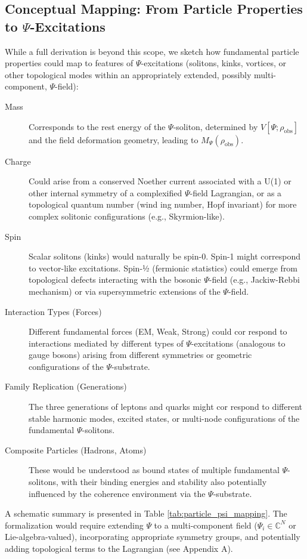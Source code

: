 \documentclass{report}
\begin{document}
    \subsection{Conceptual Mapping: From Particle Properties to $\Psi$-Excitations}
    \label{subsec:conceptual_mapping_particle_psi}
    While a full derivation is beyond this scope, we sketch how fundamental particle properties could
    map to features of $\Psi$-excitations (solitons, kinks, vortices, or other topological modes within an
    appropriately extended, possibly multi-component, $\Psi$-field):
    \begin{description}
        \item[Mass] Corresponds to the rest energy of the $\Psi$-soliton, determined by $V[\Psi; \rho_{\text{obs}}]$ and the field deformation geometry, leading to $M_{\Psi}(\rho_{\text{obs}})$.
        \item[Charge] Could arise from a conserved Noether current associated with a U(1) or other internal symmetry of a complexified $\Psi$-field Lagrangian, or as a topological quantum number (wind ing number, Hopf invariant) for more complex solitonic configurations (e.g., Skyrmion-like).
        \item[Spin] Scalar solitons (kinks) would naturally be spin-0. Spin-1 might correspond to vector-like excitations. Spin-½ (fermionic statistics) could emerge from topological defects interacting with the bosonic $\Psi$-field (e.g., Jackiw-Rebbi mechanism) or via supersymmetric extensions of the $\Psi$-field.
        \item[Interaction Types (Forces)] Different fundamental forces (EM, Weak, Strong) could cor respond to interactions mediated by different types of $\Psi$-excitations (analogous to gauge bosons) arising from different symmetries or geometric configurations of the $\Psi$-substrate.
        \item[Family Replication (Generations)] The three generations of leptons and quarks might cor respond to different stable harmonic modes, excited states, or multi-node configurations of the fundamental $\Psi$-solitons.
        \item[Composite Particles (Hadrons, Atoms)] These would be understood as bound states of multiple fundamental $\Psi$-solitons, with their binding energies and stability also potentially influenced by the coherence environment via the $\Psi$-substrate.
    \end{description}
    A schematic summary is presented in Table \ref{tab:particle_psi_mapping}. The formalization would require extending $\Psi$ to a multi-component field ($\Psi_i \in \mathbb{C}^N$ or Lie-algebra-valued), incorporating appropriate symmetry groups, and potentially adding topological terms to the Lagrangian (see Appendix A). %
\end{document}
